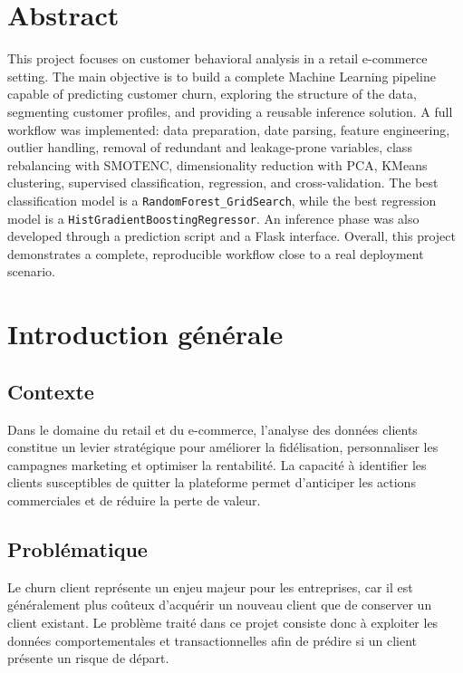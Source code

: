 \documentclass[11pt,a4paper]{article}
\begin{document}
\section*{Abstract}
This project focuses on customer behavioral analysis in a retail e-commerce setting. The main objective is to build a complete Machine Learning pipeline capable of predicting customer churn, exploring the structure of the data, segmenting customer profiles, and providing a reusable inference solution. A full workflow was implemented: data preparation, date parsing, feature engineering, outlier handling, removal of redundant and leakage-prone variables, class rebalancing with SMOTENC, dimensionality reduction with PCA, KMeans clustering, supervised classification, regression, and cross-validation. The best classification model is a \texttt{RandomForest\_GridSearch}, while the best regression model is a \texttt{HistGradientBoostingRegressor}. An inference phase was also developed through a prediction script and a Flask interface. Overall, this project demonstrates a complete, reproducible workflow close to a real deployment scenario.

\tableofcontents
\newpage

\section{Introduction générale}

\subsection{Contexte}
Dans le domaine du retail et du e-commerce, l’analyse des données clients constitue un levier stratégique pour améliorer la fidélisation, personnaliser les campagnes marketing et optimiser la rentabilité. La capacité à identifier les clients susceptibles de quitter la plateforme permet d’anticiper les actions commerciales et de réduire la perte de valeur.

\subsection{Problématique}
Le churn client représente un enjeu majeur pour les entreprises, car il est généralement plus coûteux d’acquérir un nouveau client que de conserver un client existant. Le problème traité dans ce projet consiste donc à exploiter les données comportementales et transactionnelles afin de prédire si un client présente un risque de départ.
\end{document}
